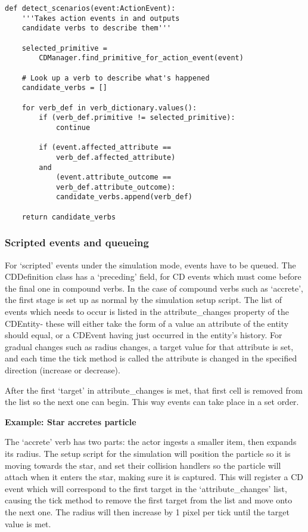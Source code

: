 \documentclass[dissertation.tex]{subfiles}
\begin{document}
\begin{lstlisting}[frame=single,caption={CDManager.detect\_scenarios method}]
def detect_scenarios(event:ActionEvent):
    '''Takes action events in and outputs
    candidate verbs to describe them'''
    
    selected_primitive =
        CDManager.find_primitive_for_action_event(event)            

    # Look up a verb to describe what's happened
    candidate_verbs = []

    for verb_def in verb_dictionary.values():
        if (verb_def.primitive != selected_primitive):
            continue

        if (event.affected_attribute ==
            verb_def.affected_attribute)
        and
            (event.attribute_outcome ==
            verb_def.attribute_outcome):
            candidate_verbs.append(verb_def)
    
    return candidate_verbs
\end{lstlisting}

    \subsubsection{Scripted events and queueing}
    For `scripted' events under the simulation mode, events have to be queued. The CDDefinition class has a `preceding' field, for CD events which must come before the final one in compound verbs. In the case of compound verbs such as `accrete', the first stage is set up as normal by the simulation setup script. The list of events which needs to occur is listed in the attribute\_changes property of the CDEntity- these will either take the form of a value an attribute of the entity should equal, or a CDEvent having just occurred in the entity's history. For gradual changes such as radius changes, a target value for that attribute is set, and each time the tick method is called the attribute is changed in the specified direction (increase or decrease).

    After the first `target' in attribute\_changes is met, that first cell is removed from the list so the next one can begin. This way events can take place in a set order.

    \textbf{Example: Star accretes particle}

    The `accrete' verb has two parts: the actor ingests a smaller item, then expands its radius. The setup script for the simulation will position the particle so it is moving towards the star, and set their collision handlers so the particle will attach when it enters the star, making sure it is captured. This will register a CD event which will correspond to the first target in the `attribute\_changes' list, causing the tick method to remove the first target from the list and move onto the next one. The radius will then increase by 1 pixel per tick until the target value is met.
\end{document}
